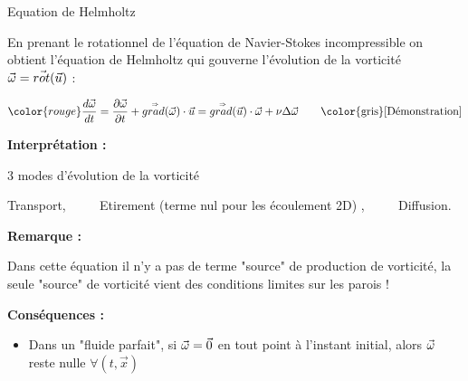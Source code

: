 \begin{frame}{Equation de Helmholtz} \hypertarget{frame:toto}{}

\small

\vspace{0mm}

En prenant le rotationnel de l'équation de Navier-Stokes incompressible on obtient l'équation de Helmholtz 
qui gouverne l'évolution de la vorticité $\vec{\omega} = \vec{rot} ( \vec{u} ) $ :

\begin{equation}
	{\color{rouge}
\ddt{\myvec{\omega}} =  \dpdt{\myvec{\omega}} + \mytensor{grad} (\myvec{\omega}) \cdot  \myvec{u} 
  = \mytensor{grad} (\myvec{u}) \cdot  \myvec{\omega} +
  \nu \Delta \myvec{\omega} \qquad }\mbox{{\color{gris}[Démonstration]}}
\end{equation}

\smallskip 
{\bf Interprétation :}  

3 modes d'évolution de la vorticité

Transport, $\qquad$ Etirement (terme nul pour les écoulement 2D) , $\qquad$ Diffusion.

\pause 
\smallskip

{\bf Remarque :} 

Dans cette équation il n'y a pas de terme "source" de production de vorticité, la seule "source" de vorticité vient des conditions limites sur les parois !

\pause





\pause 

\medskip
{\bf  Conséquences :}


\pause

\begin{itemize}


\item Dans un "fluide parfait", si  $\vec{\omega} = \vec{0}$ en tout point à l'instant initial, 
alors $\vec{\omega}$ reste nulle $\forall (t, \vec x) $


\end{itemize}
\end{frame}
